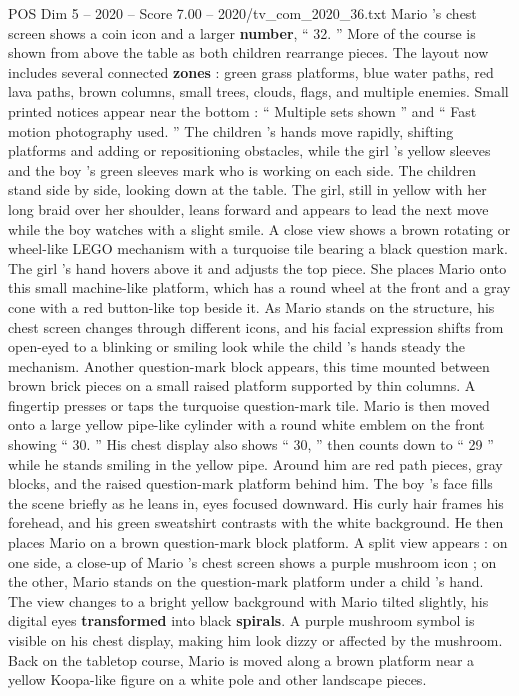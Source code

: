 \begin{textsample}{POS Dim 5 – 2020 – Score 7.00 – 2020/tv\_com\_2020\_36.txt}
Mario ’s chest screen shows a coin icon and a larger \textbf{number}, “ 32. ” More of the course is shown from above the table as both children rearrange pieces.
The layout now includes several connected \textbf{zones} : green grass platforms, blue water paths, red lava paths, brown columns, small trees, clouds, flags, and multiple enemies.
Small printed notices appear near the bottom : “ Multiple sets shown ” and “ Fast motion photography used. ” The children ’s hands move rapidly, shifting platforms and adding or repositioning obstacles, while the girl ’s yellow sleeves and the boy ’s green sleeves mark who is working on each side.
The children stand side by side, looking down at the table.
The girl, still in yellow with her long braid over her shoulder, leans forward and appears to lead the next move while the boy watches with a slight smile.
A close view shows a brown rotating or wheel-like LEGO mechanism with a turquoise tile bearing a black question mark.
The girl ’s hand hovers above it and adjusts the top piece.
She places Mario onto this small machine-like platform, which has a round wheel at the front and a gray cone with a red button-like top beside it.
As Mario stands on the structure, his chest screen changes through different icons, and his facial expression shifts from open-eyed to a blinking or smiling look while the child ’s hands steady the mechanism.
Another question-mark block appears, this time mounted between brown brick pieces on a small raised platform supported by thin columns.
A fingertip presses or taps the turquoise question-mark tile.
Mario is then moved onto a large yellow pipe-like cylinder with a round white emblem on the front showing “ 30. ” His chest display also shows “ 30, ” then counts down to “ 29 ” while he stands smiling in the yellow pipe.
Around him are red path pieces, gray blocks, and the raised question-mark platform behind him.
The boy ’s face fills the scene briefly as he leans in, eyes focused downward.
His curly hair frames his forehead, and his green sweatshirt contrasts with the white background.
He then places Mario on a brown question-mark block platform.
A split view appears : on one side, a close-up of Mario ’s chest screen shows a purple mushroom icon ; on the other, Mario stands on the question-mark platform under a child ’s hand.
The view changes to a bright yellow background with Mario tilted slightly, his digital eyes \textbf{transformed} into black \textbf{spirals}.
A purple mushroom symbol is visible on his chest display, making him look dizzy or affected by the mushroom.
Back on the tabletop course, Mario is moved along a brown platform near a yellow Koopa-like figure on a white pole and other landscape pieces.

\end{textsample}
